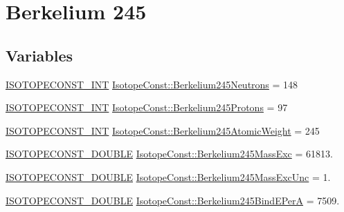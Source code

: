 \hypertarget{group___isotope_const-_berkelium-_bk245}{}\section{Berkelium 245}
\label{group___isotope_const-_berkelium-_bk245}
\subsection*{Variables}
\begin{DoxyCompactItemize}
\item 
\mbox{\hyperlink{group___isotope_const-_macros_ga5f18360b3e99483a35c32d789e62621c}{I\+S\+O\+T\+O\+P\+E\+C\+O\+N\+S\+T\+\_\+\+I\+NT}} \mbox{\hyperlink{group___isotope_const-_berkelium-_bk245_ga6d6f5c11b2074ae21960f455847486c9}{Isotope\+Const\+::\+Berkelium245\+Neutrons}} = 148
\item 
\mbox{\hyperlink{group___isotope_const-_macros_ga5f18360b3e99483a35c32d789e62621c}{I\+S\+O\+T\+O\+P\+E\+C\+O\+N\+S\+T\+\_\+\+I\+NT}} \mbox{\hyperlink{group___isotope_const-_berkelium-_bk245_ga34a6680e1dbb6a8b3eb3c0ab9b7870aa}{Isotope\+Const\+::\+Berkelium245\+Protons}} = 97
\item 
\mbox{\hyperlink{group___isotope_const-_macros_ga5f18360b3e99483a35c32d789e62621c}{I\+S\+O\+T\+O\+P\+E\+C\+O\+N\+S\+T\+\_\+\+I\+NT}} \mbox{\hyperlink{group___isotope_const-_berkelium-_bk245_ga51add281ee1dfb8c9c98df07dfb1d860}{Isotope\+Const\+::\+Berkelium245\+Atomic\+Weight}} = 245
\item 
\mbox{\hyperlink{group___isotope_const-_macros_ga8f45a7272ce02c0b4c65c44636ed719a}{I\+S\+O\+T\+O\+P\+E\+C\+O\+N\+S\+T\+\_\+\+D\+O\+U\+B\+LE}} \mbox{\hyperlink{group___isotope_const-_berkelium-_bk245_ga72fe45f14aa6372fffefff4abf3c512c}{Isotope\+Const\+::\+Berkelium245\+Mass\+Exc}} = 61813.
\item 
\mbox{\hyperlink{group___isotope_const-_macros_ga8f45a7272ce02c0b4c65c44636ed719a}{I\+S\+O\+T\+O\+P\+E\+C\+O\+N\+S\+T\+\_\+\+D\+O\+U\+B\+LE}} \mbox{\hyperlink{group___isotope_const-_berkelium-_bk245_ga43c769850c53d99c501a2823a606f3b7}{Isotope\+Const\+::\+Berkelium245\+Mass\+Exc\+Unc}} = 1.
\item 
\mbox{\hyperlink{group___isotope_const-_macros_ga8f45a7272ce02c0b4c65c44636ed719a}{I\+S\+O\+T\+O\+P\+E\+C\+O\+N\+S\+T\+\_\+\+D\+O\+U\+B\+LE}} \mbox{\hyperlink{group___isotope_const-_berkelium-_bk245_gad861eb992107b09d46aa8fd06ba9dbe6}{Isotope\+Const\+::\+Berkelium245\+Bind\+E\+PerA}} = 7509.
\item 

\end{DoxyCompactItemize}
